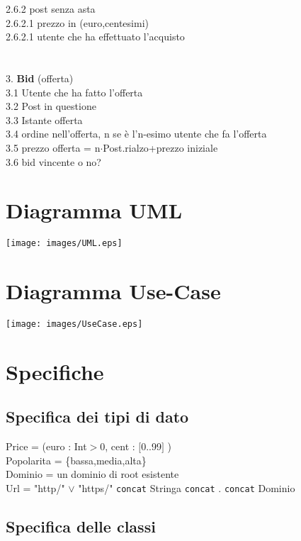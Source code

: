 \documentclass[12pt, letterpaper]{article}
\newcommand{\acc}{\\\hphantom{}\\}
\newcommand{\codee}[1]{\colorbox{white}{\texttt{#1}}}
\newcommand{\id}{{\hphantom{ident}}}
\begin{document}
\id\id	2.6.2 post senza asta\\
        \id\id\id		2.6.2.1 prezzo in (euro,centesimi)\\
        \id\id\id		2.6.2.1 utente che ha effettuato l'acquisto\\
\acc
3. \textbf{Bid} (offerta)\\
\id	3.1 Utente che ha fatto l'offerta\\
\id	3.2 Post in questione\\
    \id	3.3 Istante offerta \\
    \id	3.4 ordine nell'offerta, n se è l'n-esimo utente che fa l'offerta\\
    \id	3.5 prezzo offerta = n$\cdot$Post.rialzo+prezzo iniziale\\
    \id	3.6 bid vincente o no?\\
\section{Diagramma UML}\begin{center}
    \texttt{[image: images/UML.eps]}
\end{center}
\newpage
\section{Diagramma Use-Case}\begin{center}
    \texttt{[image: images/UseCase.eps]}
\end{center}
\newpage
\section{Specifiche}
\subsection{Specifica dei tipi di dato}
Price = (euro : Int$>$0, cent : $[$0..99$]$ ) \\ 
Popolarita = \{bassa,media,alta\}\\ 
Dominio = un dominio di root esistente\\
Url = "http/" $\lor$ "https/" \codee{concat} Stringa \codee{concat} . \codee{concat} Dominio \\
\subsection{Specifica delle classi}
\end{document}
